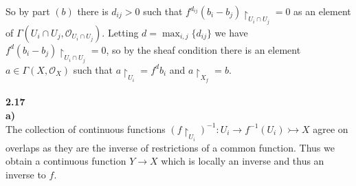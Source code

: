 \documentclass[12pt]{article}
\numberwithin{thm}{subsection}
\numberwithin{defn}{subsection}
\numberwithin{lemma}{subsection}
\numberwithin{example}{subsection}
\numberwithin{notation}{subsection}
\numberwithin{cor}{subsection}
\numberwithin{remark}{subsection}
\numberwithin{condition}{subsection}
\numberwithin{question}{subsection}
\numberwithin{construction}{subsection}
\numberwithin{construction}{subsection}
\numberwithin{construction}{subsection}
\newcommand{\call}[1]{\mathcal{#1}}
\newcommand{\lto}{\longrightarrow}
\begin{document}
So by part $(b)$ there is $d_{ij}>0$ such that $f^{d_{ij}}(b_i - b_j)\restriction_{U_{i} \cap U_j} = 0$ as an element of $\Gamma(U_i \cap U_j, \call{O}_{U_i \cap U_j})$. Letting $d = \max_{i,j}\lbrace d_{ij}\rbrace$ we have $f^d(b_i - b_j)\restriction_{U_{i} \cap U_j} = 0$, so by the sheaf condition there is an element $a \in \Gamma(X,\call{O}_X)$ such that $a\restriction_{U_i} = f^db_i$ and $a\restriction_{X_f} = b$.\\\\
%
\textbf{2.17}\\
\textbf{a)}\\
The collection of continuous functions $(f\restriction_{U_i})^{-1}: U_i \lto f^{-1}(U_i) \rightarrowtail X$ agree on overlaps as they are the inverse of restrictions of a common function. Thus we obtain a continuous function $Y \to X$ which is locally an inverse and thus an inverse to $f$.
\end{document}
